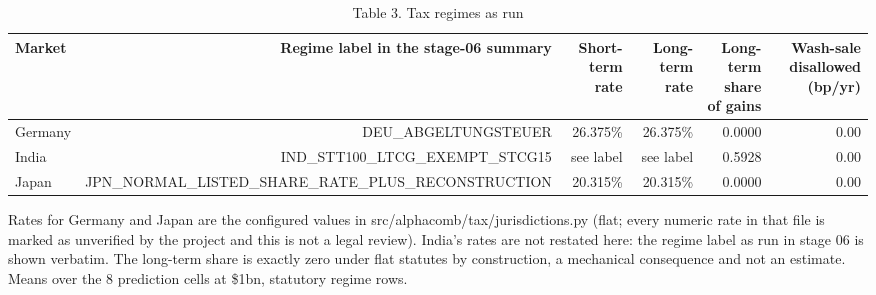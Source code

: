 \begin{table}[t]
\centering
\small
\caption{Table 3. Tax regimes as run}
\label{tab:tax}
\begin{tabular}{lrrrrr}
\toprule
Market & Regime label in the stage-06 summary & Short-term rate & Long-term rate & Long-term share of gains & Wash-sale disallowed (bp/yr) \\
\midrule
Germany & DEU\_ABGELTUNGSTEUER & 26.375\% & 26.375\% & 0.0000 & 0.00 \\
India & IND\_STT100\_LTCG\_EXEMPT\_STCG15 & see label & see label & 0.5928 & 0.00 \\
Japan & JPN\_NORMAL\_LISTED\_SHARE\_RATE\_PLUS\_RECONSTRUCTION & 20.315\% & 20.315\% & 0.0000 & 0.00 \\
\bottomrule
\end{tabular}
\par\vspace{2pt}
\parbox{\textwidth}{\footnotesize Rates for Germany and Japan are the configured values in src/alphacomb/tax/jurisdictions.py (flat; every numeric rate in that file is marked as unverified by the project and this is not a legal review). India's rates are not restated here: the regime label as run in stage 06 is shown verbatim. The long-term share is exactly zero under flat statutes by construction, a mechanical consequence and not an estimate. Means over the 8 prediction cells at \$1bn, statutory regime rows.}
\end{table}
